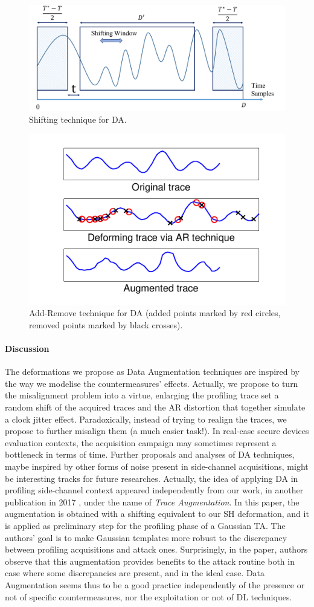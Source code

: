 \begin{figure}[t]
\centering
\includegraphics[width=.5\textwidth]{../Figures/CHES2017/Shifting_window.pdf}
\caption{Shifting technique for DA.}\label{fig:SH}
\end{figure}

\begin{figure}[t]
\centering
\includegraphics[width=.5\textwidth]{../Figures/CHES2017/AR_example.pdf}
\caption[Add-Remove technique for DA.]{Add-Remove technique for DA (added points marked by red circles, removed points marked by black crosses).}\label{fig:AR}
\end{figure}

\paragraph*{Discussion}
The deformations we propose as Data Augmentation techniques are inspired by the way we modelise the countermeasures' effects. Actually, we propose to turn the misalignment problem into a virtue, enlarging the profiling trace set \via a random shift of the acquired traces and the AR distortion that together simulate a clock jitter effect. Paradoxically, instead of trying to realign the traces, we propose to further misalign them (a much easier task!). In real-case secure devices evaluation contexts, the acquisition campaign may sometimes represent a bottleneck in terms of time. Further proposals and analyses of  DA techniques, maybe inspired by other forms of noise present in side-channel acquisitions, might be interesting tracks for future researches. Actually, the idea of applying DA in profiling side-channel context appeared independently from our work, in another publication in 2017 \cite{pu2017trace}, under the name of \emph{Trace Augmentation}. In this paper, the augmentation is obtained with a shifting equivalent to our SH deformation, and it is applied as preliminary step for the profiling phase of a Gaussian TA. The authors' goal is to make Gaussian templates more robust to the discrepancy between profiling acquisitions and attack ones. Surprisingly, in the paper, authors observe that this augmentation provides benefits to the attack routine both in case where some discrepancies are present, and in the ideal case. Data Augmentation seems thus to be a good practice independently of the presence or not of specific countermeasures, nor the exploitation or not of DL techniques.



